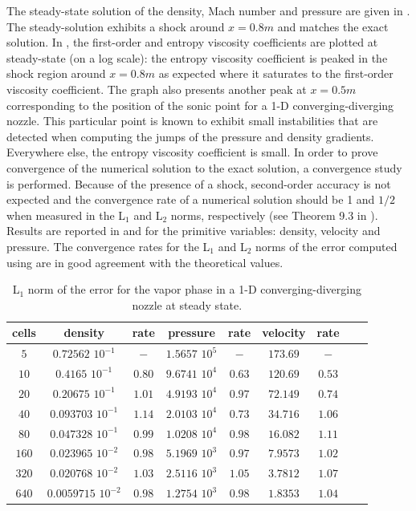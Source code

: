 %
The steady-state solution of the density, Mach number and pressure are given in . The steady-solution exhibits a shock around $x=0.8m$ and matches the exact solution. In , the first-order and entropy viscosity coefficients are plotted at steady-state (on a log scale): the entropy viscosity coefficient is peaked in the shock region around $x=0.8m$ as expected where it saturates to the first-order viscosity coefficient. The graph also presents another peak at $x=0.5m$  corresponding to the position of the sonic point for a 1-D converging-diverging nozzle. This particular point is known to exhibit small instabilities that are detected when computing the jumps of the pressure and density gradients. Everywhere else, the entropy  viscosity coefficient is small. In order to prove convergence of the numerical solution to the exact solution, a convergence study is performed. Because of the presence of a shock, second-order accuracy is not expected and the convergence rate of a numerical solution should be 1 and $1/2$ when measured in the L$_1$ and L$_2$ norms, respectively (see Theorem 9.3 in \cite{convergence_book}). Results are reported in  and  for the primitive variables: density, velocity and pressure. The convergence rates for the L$_1$ and L$_2$ norms of the error computed using  are in good agreement with the theoretical values.
%
\begin{table}[H]
\begin{center}
 \caption{\label{tbl:l1_norm_vap} L$_1$ norm of the error for the vapor phase in a 1-D converging-diverging nozzle at steady state.}
 \begin{tabular}{|c|c|c|c|c|c|c|c|c|}
 \hline
cells & density              & rate      & pressure          & rate      & velocity & rate      \\ \hline
$5$  & $0.72562$   $10^{-1}$ & $-$       & $1.5657$ $10^{5}$ & $-$       & $173.69$ & $-$       \\ \hline
$10$ & $0.4165$    $10^{-1}$ & $0.80$ & $9.6741$ $10^{4}$ & $0.63$ & $120.69$ & $0.53$ \\ \hline
$20$ & $0.20675$   $10^{-1}$ & $1.01$  & $4.9193$ $10^{4}$ & $0.97$ & $72.149$ & $0.74$ \\ \hline
$40$ & $0.093703$  $10^{-1}$ & $1.14$  & $2.0103$ $10^{4}$ & $0.73$ & $34.716$ & $1.06$  \\ \hline
$80$ & $0.047328$  $10^{-1}$ & $0.99$  & $1.0208$ $10^{4}$ & $0.98$  & $16.082$ & $1.11$  \\ \hline
$160$& $0.023965$  $10^{-2}$ & $0.98$  & $5.1969$ $10^{3}$ & $0.97$  & $7.9573$ & $1.02$  \\ \hline
$320$& $0.020768$  $10^{-2}$ & $1.03$  & $2.5116$ $10^{3}$ & $1.05$  & $3.7812$ & $1.07$  \\ \hline
$640$& $0.0059715$ $10^{-2}$ & $0.98$  & $1.2754$ $10^{3}$ & $0.98$  & $1.8353$ & $1.04$  \\ \hline
\end{tabular}
\end{center}
\nonumber
\end{table}
